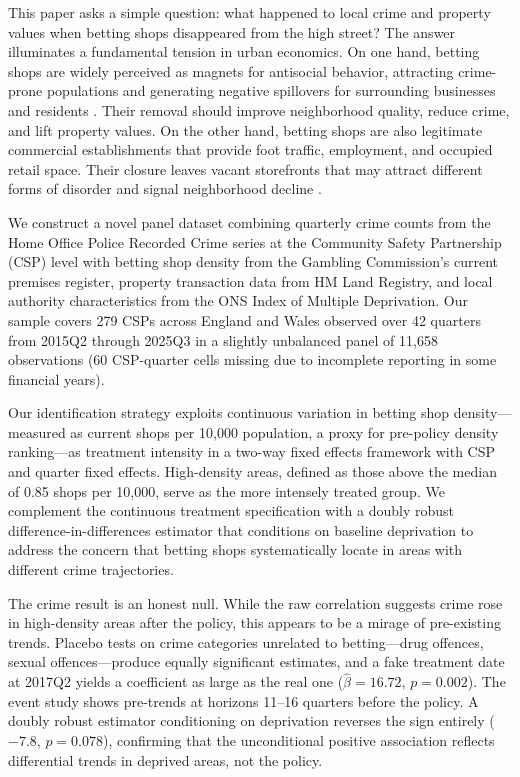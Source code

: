 \documentclass[12pt]{article}
\begin{document}
This paper asks a simple question: what happened to local crime and property values when betting shops disappeared from the high street? The answer illuminates a fundamental tension in urban economics. On one hand, betting shops are widely perceived as magnets for antisocial behavior, attracting crime-prone populations and generating negative spillovers for surrounding businesses and residents \citep{wardle2014, forrest2016}. Their removal should improve neighborhood quality, reduce crime, and lift property values. On the other hand, betting shops are also legitimate commercial establishments that provide foot traffic, employment, and occupied retail space. Their closure leaves vacant storefronts that may attract different forms of disorder and signal neighborhood decline \citep{mallach2018}.

We construct a novel panel dataset combining quarterly crime counts from the Home Office Police Recorded Crime series at the Community Safety Partnership (CSP) level with betting shop density from the Gambling Commission's current premises register, property transaction data from HM Land Registry, and local authority characteristics from the ONS Index of Multiple Deprivation. Our sample covers 279 CSPs across England and Wales observed over 42 quarters from 2015Q2 through 2025Q3 in a slightly unbalanced panel of 11,658 observations (60 CSP-quarter cells missing due to incomplete reporting in some financial years).

Our identification strategy exploits continuous variation in betting shop density---measured as current shops per 10,000 population, a proxy for pre-policy density ranking---as treatment intensity in a two-way fixed effects framework with CSP and quarter fixed effects. High-density areas, defined as those above the median of 0.85 shops per 10,000, serve as the more intensely treated group. We complement the continuous treatment specification with a doubly robust difference-in-differences estimator \citep{santanna2020} that conditions on baseline deprivation to address the concern that betting shops systematically locate in areas with different crime trajectories.

The crime result is an honest null. While the raw correlation suggests crime rose in high-density areas after the policy, this appears to be a mirage of pre-existing trends. Placebo tests on crime categories unrelated to betting---drug offences, sexual offences---produce equally significant estimates, and a fake treatment date at 2017Q2 yields a coefficient as large as the real one ($\hat{\beta} = 16.72$, $p = 0.002$). The event study shows pre-trends at horizons 11--16 quarters before the policy. A doubly robust estimator conditioning on deprivation reverses the sign entirely ($-7.8$, $p = 0.078$), confirming that the unconditional positive association reflects differential trends in deprived areas, not the policy.
\end{document}
